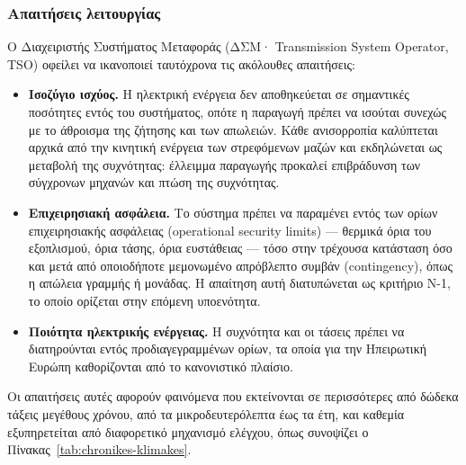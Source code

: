 \subsubsection*{Απαιτήσεις λειτουργίας}

Ο Διαχειριστής Συστήματος Μεταφοράς (ΔΣΜ· Transmission System Operator, TSO) οφείλει να
ικανοποιεί ταυτόχρονα τις ακόλουθες απαιτήσεις:

\begin{itemize}
\item \textbf{Ισοζύγιο ισχύος.} Η ηλεκτρική ενέργεια δεν αποθηκεύεται σε σημαντικές
      ποσότητες εντός του συστήματος, οπότε η παραγωγή πρέπει να ισούται συνεχώς με το
      άθροισμα της ζήτησης και των απωλειών. Κάθε ανισορροπία καλύπτεται αρχικά από την
      κινητική ενέργεια των στρεφόμενων μαζών και εκδηλώνεται ως μεταβολή της συχνότητας:
      έλλειμμα παραγωγής προκαλεί επιβράδυνση των σύγχρονων μηχανών και πτώση της
      συχνότητας.
\item \textbf{Επιχειρησιακή ασφάλεια.} Το σύστημα πρέπει να παραμένει εντός των ορίων
      επιχειρησιακής ασφάλειας (operational security limits) — θερμικά όρια του
      εξοπλισμού, όρια τάσης, όρια ευστάθειας — τόσο στην τρέχουσα κατάσταση όσο και μετά
      από οποιοδήποτε μεμονωμένο απρόβλεπτο συμβάν (contingency), όπως η απώλεια γραμμής ή
      μονάδας. Η απαίτηση αυτή διατυπώνεται ως κριτήριο N-1, το οποίο ορίζεται στην επόμενη
      υποενότητα.
\item \textbf{Ποιότητα ηλεκτρικής ενέργειας.} Η συχνότητα και οι τάσεις πρέπει να
      διατηρούνται εντός προδιαγεγραμμένων ορίων, τα οποία για την Ηπειρωτική Ευρώπη
      καθορίζονται από το κανονιστικό πλαίσιο.
\end{itemize}

Οι απαιτήσεις αυτές αφορούν φαινόμενα που εκτείνονται σε περισσότερες από δώδεκα τάξεις
μεγέθους χρόνου, από τα μικροδευτερόλεπτα έως τα έτη, και καθεμία εξυπηρετείται από
διαφορετικό μηχανισμό ελέγχου, όπως συνοψίζει ο Πίνακας~\ref{tab:chronikes-klimakes}.

